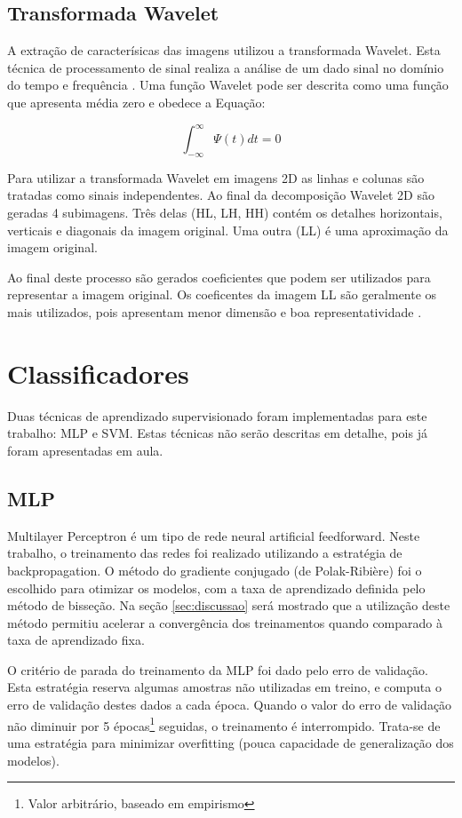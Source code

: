 \documentclass[conference]{IEEEtran}
\begin{document}
\subsection{Transformada Wavelet}
A extração de caracterísicas das imagens utilizou a transformada Wavelet. Esta técnica de processamento de sinal realiza a análise de um dado sinal no domínio do tempo e frequência \cite{costa2011ensemble}. Uma função Wavelet pode ser descrita como uma função que apresenta média zero e obedece a Equação:

\[\int_{-\infty}^{\infty} \Psi(t)dt = 0\]

Para utilizar a transformada Wavelet em imagens 2D as linhas e colunas são tratadas como sinais independentes. Ao final da decomposição Wavelet 2D são geradas 4 subimagens. Três delas (HL, LH, HH) contém os detalhes horizontais, verticais e diagonais da imagem original. Uma outra (LL) é uma aproximação da imagem original.

Ao final deste processo são gerados coeficientes que podem ser utilizados para representar a imagem original. Os coeficentes da imagem LL são geralmente os mais utilizados, pois apresentam menor dimensão e boa representatividade \cite{burrus1997introduction}.

\section{Classificadores}
Duas técnicas de aprendizado supervisionado foram implementadas para este trabalho: MLP e SVM. Estas técnicas não serão descritas em detalhe, pois já foram apresentadas em aula.

\subsection{MLP}
Multilayer Perceptron é um tipo de rede neural artificial feedforward. Neste trabalho, o treinamento das redes foi realizado utilizando a estratégia de backpropagation. O método do gradiente conjugado (de Polak-Ribière) foi o escolhido para otimizar os modelos, com a taxa de aprendizado definida pelo método de bisseção. Na seção \ref{sec:discussao} será mostrado que a utilização deste método permitiu acelerar a convergência dos treinamentos quando comparado à taxa de aprendizado fixa.

O critério de parada do treinamento da MLP foi dado pelo erro de validação. Esta estratégia reserva algumas amostras não utilizadas em treino, e computa o erro de validação destes dados a cada época. Quando o valor do erro de validação não diminuir por 5 épocas\footnote{Valor arbitrário, baseado em empirismo} seguidas, o treinamento é interrompido. Trata-se de uma estratégia para minimizar overfitting (pouca capacidade de generalização dos modelos).
\end{document}
